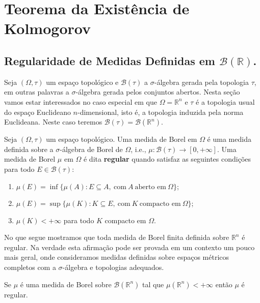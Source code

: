 \chapter[Aula 11]{Teorema da Existência de Kolmogorov}
\chaptermark{}



\section{Regularidade de Medidas Definidas 
em $\mathscr{B}(\mathbb{R})$.}

Seja $(\Omega,\tau)$ um espaço topológico e 
$\mathscr{B}(\tau)$ a $\sigma$-álgebra gerada
pela topologia $\tau$, em outras palavras
a $\sigma$-álgebra gerada pelos conjuntos abertos.  
Nesta seção vamos estar
interessados no caso especial em que $\Omega=\mathbb{R}^n$
e $\tau$ é a topologia usual do espaço Euclideano $n$-dimensional,
isto é, a topologia induzida pela norma Euclideana. 
Neste caso teremos $\mathscr{B}(\tau)=\mathscr{B}(\mathbb{R}^n)$.

\begin{definicao}\label{def-regularidade-medida-borel}
Seja $(\Omega,\tau)$ um espaço topológico. 
Uma medida de Borel em $\Omega$ é uma medida
definida sobre a $\sigma$-álgebra de Borel de $\Omega$, i.e.,  
$\mu:\mathscr{B}(\tau)\to [0,+\infty]$.
Uma medida de Borel $\mu$ em $\Omega$ é dita
{\bf regular} quando satisfaz as seguintes condições
para todo $E\in \mathscr{B}(\tau)$: 
\begin{enumerate}
\item  
$
\mu(E) 
= 
\inf \{\mu(A): E\subseteq A,\ \text{com}\ A\ \text{aberto em}\ \Omega  \}
$;

\item
$
\mu(E) 
= 
\sup \{\mu(K): K\subseteq E,\ \text{com}\ K\ \text{compacto em}\ \Omega  \}
$;

\item 
$\mu(K)<+\infty$ para todo $K$ compacto em $\Omega$.
\end{enumerate}
\end{definicao}


No que segue mostramos que toda medida de Borel finita
definida sobre $\mathbb{R}^n$ é regular. 
Na verdade esta afirmação pode ser provada em
um contexto um pouco mais geral, onde consideramos medidas
definidas sobre espaços métricos completos
com a $\sigma$-álgebra e topologias adequados.  

\begin{teorema}\label{teo-regularidade-med-borel}
Se $\mu$ é uma medida de Borel sobre $\mathscr{B}(\mathbb{R}^n)$
tal que $\mu(\mathbb{R}^n)<+\infty$ então $\mu$ é regular.
\end{teorema}



